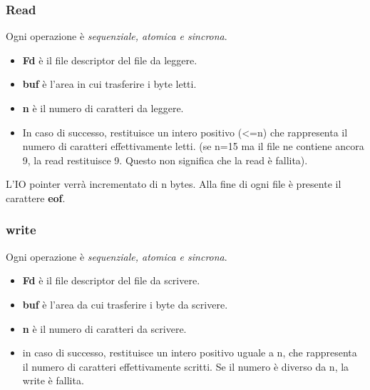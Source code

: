 \documentclass{article}
\begin{document}
\subsubsection{Read}
\noindent {} 
\medskip

\noindent Ogni operazione è \textit{sequenziale, atomica e sincrona}.
\begin{itemize}
    \item \textbf{Fd} è il file descriptor del file da leggere.
    \item \textbf{buf} è l'area in cui trasferire i byte letti.
    \item \textbf{n} è il numero di caratteri da leggere.
    \item In caso di successo, restituisce un intero
    positivo (<=n) che rappresenta il numero di
    caratteri effettivamente letti. (se n=15 ma il file ne contiene 
    ancora 9, la read restituisce 9. Questo non significa che la read è
    fallita). 
\end{itemize}

\noindent L'IO pointer verrà incrementato di n bytes. Alla fine di ogni
file è presente il carattere \textbf{eof}.



\subsubsection{write}
\noindent {} 
\medskip

\noindent Ogni operazione è \textit{sequenziale, atomica e sincrona}.
\begin{itemize}
    \item \textbf{Fd} è il file descriptor del file da scrivere.
    \item \textbf{buf} è l'area da cui trasferire i byte da scrivere.
    \item \textbf{n} è il numero di caratteri da scrivere.
    \item in caso di successo, restituisce un intero positivo
    uguale a n, che rappresenta il numero di caratteri
    effettivamente scritti. Se il numero è diverso da n,
    la write è fallita.
\end{itemize}
\end{document}
